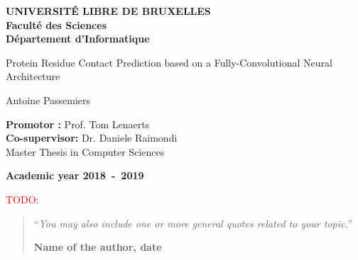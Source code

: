 \documentclass[11pt,a4paper,oneside]{book}
\newcommand{\todo}[1]{\textcolor{red}{TODO: #1}}
\begin{document}
\frontmatter
\begin{titlepage}
\begin{center}
\textbf{UNIVERSIT\'E LIBRE DE BRUXELLES}\\
\textbf{Facult\'{e} des Sciences}\\
\textbf{D\'{e}partement d'Informatique}
\vfill{}\vfill{}

{\huge Protein Residue Contact Prediction based \vspace*{.5cm} \linebreak[4]
on a Fully-Convolutional Neural Architecture}

{\Huge \par}
\begin{center}{\LARGE Antoine Passemiers}\end{center}{\Huge \par}
\vfill{}\vfill{}
\begin{flushright}{
    \large \textbf{Promotor :} Prof. Tom Lenaerts \\
    \textbf{Co-supervisor: } Dr. Daniele Raimondi} \\
    \vspace{0.5cm}
\hfill{}{\large Master Thesis in Computer Sciences}\\
{\large }\hfill{}{}\end{flushright}{\large\par}
\vfill{}\vfill{}\enlargethispage{3cm}
\textbf{Academic year 2018~-~2019}
\end{center}
\end{titlepage}
\newpage
\thispagestyle{empty} 
\null

\newenvironment{vcenterpage}
{\newpage\thispagestyle{empty} 
\vspace*{\fill}}
{\vspace*{\fill}\par\pagebreak}



\thispagestyle{empty}
\vspace*{5cm}

\todo{}

\begin{quotation}
\noindent ``\emph{You may also include one or more general quotes related to your topic.}''
\begin{flushright}\textbf{Name of the author, date}\end{flushright}
\end{quotation}
\end{document}
